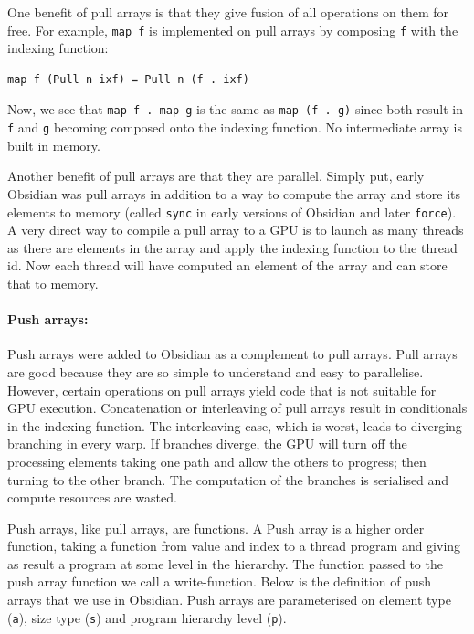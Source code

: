 \documentclass[a4paper]{book}
\begin{document}
One benefit of pull arrays is that they give fusion of all operations on them for free. 
For example, {\tt map f} is implemented on pull arrays by composing {\tt f} with the indexing function: 

\begin{verbatim} 
map f (Pull n ixf) = Pull n (f . ixf)
\end{verbatim}

Now, we see that \verb!map f . map g! is the same as \verb!map (f . g)! since both result in {\tt f}
and {\tt g} becoming composed onto the indexing function. No intermediate array is built in 
memory.  

Another benefit of pull arrays are that they are parallel. Simply put, early Obsidian was pull 
arrays in addition to a way to compute the array and store its elements to memory 
(called {\tt sync} in early versions of Obsidian and later {\tt force}). A very 
direct way to compile a pull array to a GPU is to launch as many threads as there are 
elements in the array and apply the indexing function to the thread id. Now each thread 
will have computed an element of the array and can store that to memory. 

 
\paragraph{Push arrays:}

Push arrays were added to Obsidian as a complement to pull arrays. Pull arrays are 
good because they are so simple to understand and easy to parallelise. However, certain
operations on pull arrays yield code that is not suitable for GPU execution. Concatenation 
or interleaving of pull arrays result in conditionals in the indexing function. The 
interleaving case, which is worst, leads to diverging branching in every warp. If branches 
diverge, the GPU will turn off the processing elements taking one path and 
allow the others to progress; then turning to the other branch. The computation of the 
branches is serialised and compute resources are wasted. 

Push arrays, like pull arrays, are functions. A Push array is a higher order 
function, taking a function from value and index to a thread program and giving 
as result a program at some level in the hierarchy. The function passed to the 
push array function we call a write-function. Below is the definition of 
push arrays that we use in Obsidian. Push arrays are parameterised on element 
type ({\tt a}), size type ({\tt s}) and program hierarchy level ({\tt p}). 
\end{document}
